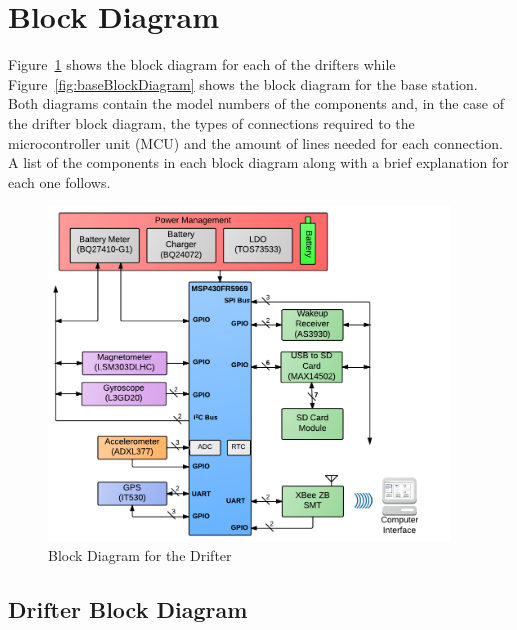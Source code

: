 \clearpage\section{Block Diagram}

Figure~\ref{fig:drifterBlockDiagram} shows the block diagram for each of the drifters while Figure~\ref{fig:baseBlockDiagram} shows the block diagram for the base station.  Both diagrams contain the model numbers of the components and, in the case of the drifter block diagram, the types of connections required to the microcontroller unit (MCU) and the amount of lines needed for each connection.  A list of the components in each block diagram along with a brief explanation for each one follows.

\begin{figure}[ht]
	\centering
	\includegraphics[width=0.95\textwidth]{img/blockDiagram}
	\caption{Block Diagram for the Drifter \label{fig:drifterBlockDiagram}}
\end{figure}

\subsection{Drifter Block Diagram}

